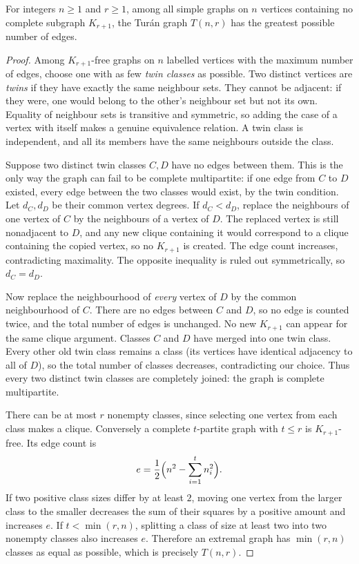 \begin{theorem}[Tur\'an]\label{thm:turan}
For integers $n\ge1$ and $r\ge1$, among all simple graphs on $n$ vertices containing no complete subgraph $K_{r+1}$, the Tur\'an graph $T(n,r)$ has the greatest possible number of edges.
\end{theorem}
\begin{proof}
Among $K_{r+1}$-free graphs on $n$ labelled vertices with the maximum number of edges, choose one with as few \emph{twin classes} as possible. Two distinct vertices are \emph{twins} if they have exactly the same neighbour sets. They cannot be adjacent: if they were, one would belong to the other's neighbour set but not its own. Equality of neighbour sets is transitive and symmetric, so adding the case of a vertex with itself makes a genuine equivalence relation. A twin class is independent, and all its members have the same neighbours outside the class.

Suppose two distinct twin classes $C,D$ have no edges between them. This is the only way the graph can fail to be complete multipartite: if one edge from $C$ to $D$ existed, every edge between the two classes would exist, by the twin condition. Let $d_C,d_D$ be their common vertex degrees. If $d_C<d_D$, replace the neighbours of one vertex of $C$ by the neighbours of a vertex of $D$. The replaced vertex is still nonadjacent to $D$, and any new clique containing it would correspond to a clique containing the copied vertex, so no $K_{r+1}$ is created. The edge count increases, contradicting maximality. The opposite inequality is ruled out symmetrically, so $d_C=d_D$.

Now replace the neighbourhood of \emph{every} vertex of $D$ by the common neighbourhood of $C$. There are no edges between $C$ and $D$, so no edge is counted twice, and the total number of edges is unchanged. No new $K_{r+1}$ can appear for the same clique argument. Classes $C$ and $D$ have merged into one twin class. Every other old twin class remains a class (its vertices have identical adjacency to all of $D$), so the total number of classes decreases, contradicting our choice. Thus every two distinct twin classes are completely joined: the graph is complete multipartite.

There can be at most $r$ nonempty classes, since selecting one vertex from each class makes a clique. Conversely a complete $t$-partite graph with $t\le r$ is $K_{r+1}$-free. Its edge count is
\[
 e=\frac12\Bigl(n^2-\sum_{i=1}^{t}n_i^2\Bigr).
\]
If two positive class sizes differ by at least $2$, moving one vertex from the larger class to the smaller decreases the sum of their squares by a positive amount and increases $e$. If $t<\min(r,n)$, splitting a class of size at least two into two nonempty classes also increases $e$. Therefore an extremal graph has $\min(r,n)$ classes as equal as possible, which is precisely $T(n,r)$.
\end{proof}

